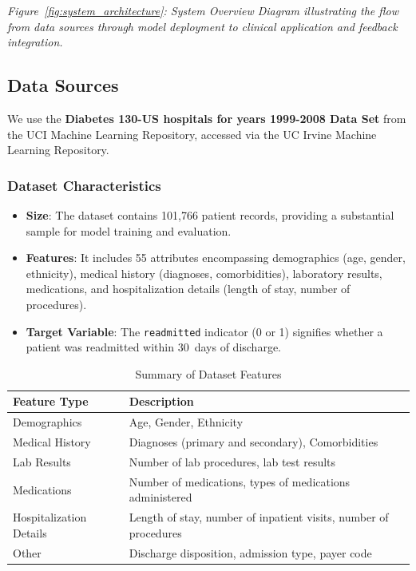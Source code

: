 \documentclass{article}
\begin{document}
\textit{Figure~\ref{fig:system_architecture}: System Overview Diagram illustrating the flow from data sources through model deployment to clinical application and feedback integration.}

\subsection{Data Sources}

We use the \textbf{Diabetes 130-US hospitals for years 1999-2008 Data Set} from the UCI Machine Learning Repository, accessed via the UC Irvine Machine Learning Repository.

\subsubsection{Dataset Characteristics}

\begin{itemize}[leftmargin=*]
    \item \textbf{Size}: The dataset contains 101,766 patient records, providing a substantial sample for model training and evaluation.
    \item \textbf{Features}: It includes 55 attributes encompassing demographics (age, gender, ethnicity), medical history (diagnoses, comorbidities), laboratory results, medications, and hospitalization details (length of stay, number of procedures).
    \item \textbf{Target Variable}: The \texttt{readmitted} indicator (0 or 1) signifies whether a patient was readmitted within 30~days of discharge.
\end{itemize}

\begin{table}[H]
\centering
\caption{Summary of Dataset Features}\label{tab:dataset_features}
\begin{tabular}{p{3cm} p{10cm}}
\toprule
\textbf{Feature Type} & \textbf{Description} \\
\midrule
Demographics & Age, Gender, Ethnicity \\
Medical History & Diagnoses (primary and secondary), Comorbidities \\
Lab Results & Number of lab procedures, lab test results \\
Medications & Number of medications, types of medications administered \\
Hospitalization Details & Length of stay, number of inpatient visits, number of procedures \\
Other & Discharge disposition, admission type, payer code \\
\bottomrule
\end{tabular}
\end{table}
\end{document}
